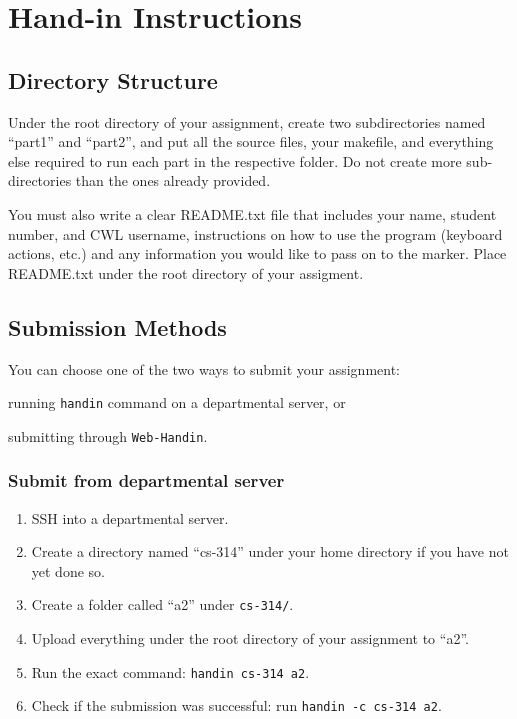 \documentclass[12pt]{exam}
\begin{document}
\section{Hand-in Instructions}
\subsection{Directory Structure}
Under the root directory of your assignment, create two subdirectories
named ``part1'' and ``part2'', and put all the source files, your
makefile, and everything else required to run each part in the respective
folder. Do not create more sub-directories than the ones already provided. 

You must also write a clear README.txt file that includes your name,
student number, and CWL username, instructions on how to use the
program (keyboard actions, etc.) and any information you would like to
pass on to the marker. Place README.txt under the root directory of your
assigment.

\subsection{Submission Methods}
You can choose one of the two ways to submit your assignment: 
\begin{inparaenum}
  \item running {\tt handin} command on a departmental server, or
  \item submitting through {\tt Web-Handin}.
\end{inparaenum}

\subsubsection{Submit from departmental server}
\begin{enumerate}[1.]
  \item SSH into a departmental server.
  \item Create a directory named ``cs-314'' under your home directory if you have not yet done so.
  \item Create a folder called ``a2'' under {\tt cs-314/}.
  \item Upload everything under the root directory of your assignment to ``a2''.
  \item Run the exact command: {\tt handin cs-314 a2}.
  \item Check if the submission was successful: run {\tt handin -c cs-314 a2}.
\end{enumerate}
\end{document}
